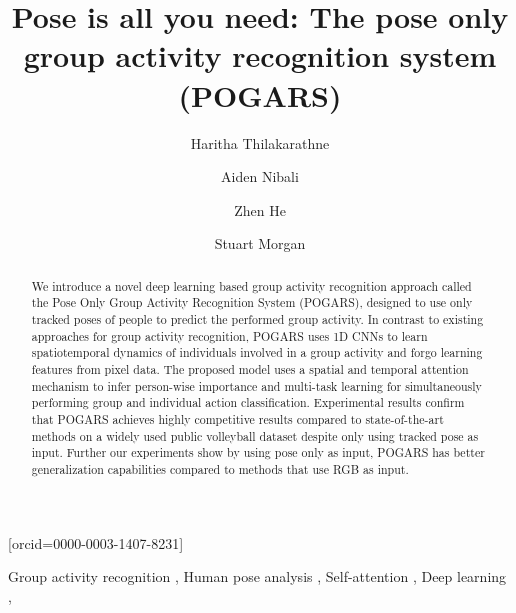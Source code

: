 \documentclass[a4paper,fleqn]{cas-dc}
\begin{document}
\def\floatpagepagefraction{1}
\def\textpagefraction{.001}
\makeatletter
\def\ps@pprintTitle{\let\@oddhead\@empty
   \let\@evenhead\@empty
   \let\@oddfoot\@empty
   \let\@evenfoot\@oddfoot
}
\makeatother



\title [mode = title]{Pose is all you need: The pose only group activity recognition system (POGARS)}
\author[1]{Haritha Thilakarathne}[orcid=0000-0003-1407-8231]
\author[1]{Aiden Nibali}
\author[1]{Zhen He}
\author[2]{Stuart Morgan}
\address[1]{Department of Computer Science and Information Technology, La Trobe University, Melbourne, VIC, Australia}
\address[2]{Australian Institute of Sport, Canberra, ACT, Australia}
\makeatletter
\begin{abstract}
  We introduce a novel deep learning based group activity recognition approach called the Pose Only Group Activity Recognition System (POGARS), designed to use only tracked poses of people to predict the performed group activity.
  In contrast to existing approaches for group activity recognition, POGARS uses 1D CNNs to learn spatiotemporal dynamics of individuals involved in a group activity and forgo learning features from pixel data. 
  The proposed model uses a spatial and temporal attention mechanism to infer person-wise importance and multi-task learning for simultaneously performing group and individual action classification.  
  Experimental results confirm that POGARS achieves highly competitive results compared to state-of-the-art methods on a widely used public volleyball dataset despite only using tracked pose as input.
  Further our experiments show by using pose only as input, POGARS has better generalization capabilities compared to methods that use RGB as input.
\end{abstract}
\begin{keywords}
  Group activity recognition \sep
  Human pose analysis \sep
  Self-attention \sep
  Deep learning \sep
\end{keywords}
\maketitle
\end{document}
